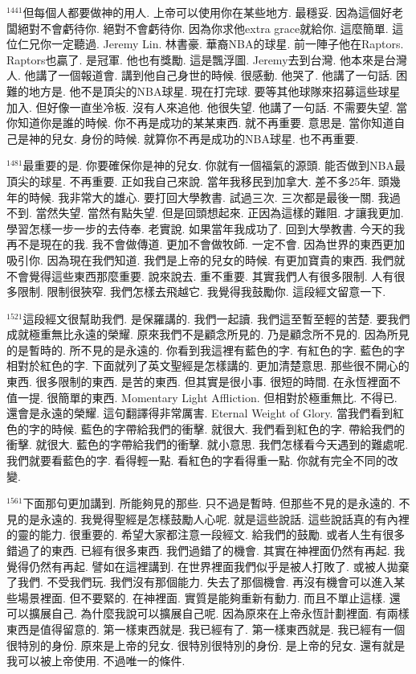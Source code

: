 \documentclass{book}
\begin{document}
$^{1441}$但每個人都要做神的用人.
上帝可以使用你在某些地方.
最穩妥.
因為這個好老闆絕對不會虧待你.
絕對不會虧待你.
因為你求他extra grace就給你.
這麼簡單.
這位仁兄你一定聽過.
Jeremy Lin.
林書豪.
華裔NBA的球星.
前一陣子他在Raptors.
Raptors也贏了.
是冠軍.
他也有獎勵.
這是飄浮圖.
Jeremy去到台灣.
他本來是台灣人.
他講了一個報道會.
講到他自己身世的時候.
很感動.
他哭了.
他講了一句話.
困難的地方是.
他不是頂尖的NBA球星.
現在打完球.
要等其他球隊來招募這些球星加入.
但好像一直坐冷板.
沒有人來追他.
他很失望.
他講了一句話.
不需要失望.
當你知道你是誰的時候.
你不再是成功的某某東西.
就不再重要.
意思是.
當你知道自己是神的兒女.
身份的時候.
就算你不再是成功的NBA球星.
也不再重要.

$^{1481}$最重要的是.
你要確保你是神的兒女.
你就有一個福氣的源頭.
能否做到NBA最頂尖的球星.
不再重要.
正如我自己來說.
當年我移民到加拿大.
差不多25年.
頭幾年的時候.
我非常大的雄心.
要打回大學教書.
試過三次.
三次都是最後一關.
我過不到.
當然失望.
當然有點失望.
但是回頭想起來.
正因為這樣的難阻.
才讓我更加.
學習怎樣一步一步的去侍奉.
老實說.
如果當年我成功了.
回到大學教書.
今天的我再不是現在的我.
我不會做傳道.
更加不會做牧師.
一定不會.
因為世界的東西更加吸引你.
因為現在我們知道.
我們是上帝的兒女的時候.
有更加寶貴的東西.
我們就不會覺得這些東西那麼重要.
說來說去.
重不重要.
其實我們人有很多限制.
人有很多限制.
限制很狹窄.
我們怎樣去飛越它.
我覺得我鼓勵你.
這段經文留意一下.

$^{1521}$這段經文很幫助我們.
是保羅講的.
我們一起讀.
我們這至暫至輕的苦楚.
要我們成就極重無比永遠的榮耀.
原來我們不是顧念所見的.
乃是顧念所不見的.
因為所見的是暫時的.
所不見的是永遠的.
你看到我這裡有藍色的字.
有紅色的字.
藍色的字相對於紅色的字.
下面就列了英文聖經是怎樣講的.
更加清楚意思.
那些很不開心的東西.
很多限制的東西.
是苦的東西.
但其實是很小事.
很短的時間.
在永恆裡面不值一提.
很簡單的東西.
Momentary Light Affliction.
但相對於極重無比.
不得已.
還會是永遠的榮耀.
這句翻譯得非常厲害.
Eternal Weight of Glory.
當我們看到紅色的字的時候.
藍色的字帶給我們的衝擊.
就很大.
我們看到紅色的字.
帶給我們的衝擊.
就很大.
藍色的字帶給我們的衝擊.
就小意思.
我們怎樣看今天遇到的難處呢.
我們就要看藍色的字.
看得輕一點.
看紅色的字看得重一點.
你就有完全不同的改變.

$^{1561}$下面那句更加講到.
所能夠見的那些.
只不過是暫時.
但那些不見的是永遠的.
不見的是永遠的.
我覺得聖經是怎樣鼓勵人心呢.
就是這些說話.
這些說話真的有內裡的靈的能力.
很重要的.
希望大家都注意一段經文.
給我們的鼓勵.
或者人生有很多錯過了的東西.
已經有很多東西.
我們過錯了的機會.
其實在神裡面仍然有再起.
我覺得仍然有再起.
譬如在這裡講到.
在世界裡面我們似乎是被人打敗了.
或被人拋棄了我們.
不受我們玩.
我們沒有那個能力.
失去了那個機會.
再沒有機會可以進入某些場景裡面.
但不要緊的.
在神裡面.
實質是能夠重新有動力.
而且不單止這樣.
還可以擴展自己.
為什麼我說可以擴展自己呢.
因為原來在上帝永恆計劃裡面.
有兩樣東西是值得留意的.
第一樣東西就是.
我已經有了.
第一樣東西就是.
我已經有一個很特別的身份.
原來是上帝的兒女.
很特別很特別的身份.
是上帝的兒女.
還有就是我可以被上帝使用.
不過唯一的條件.
\end{document}
